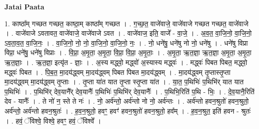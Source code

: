 \documentclass[17pt]{extarticle}
\begin{document}
\textbf{Jatai Paata} \newline

1. काष्ठा᳚म् गच्छत गच्छत॒ काष्ठा॒म् काष्ठा᳚म् गच्छत । . ग॒च्छ॒त॒ वाजे॑वाजे॒ वाजे॑वाजे गच्छत गच्छत॒ वाजे॑वाजे । . वाजे॑वाजे ऽवतावत॒ वाजे॑वाजे॒ वाजे॑वाजे ऽवत । . वाजे॑वाज॒ इति॒ वाजे᳚ - वा॒जे॒ । . अ॒व॒त॒ वा॒जि॒नो॒ वा॒जि॒नो॒ ऽव॒ता॒व॒त॒ वा॒जि॒नः॒ । . वा॒जि॒नो॒ नो॒ नो॒ वा॒जि॒नो॒ वा॒जि॒नो॒ नः॒ । . नो॒ धने॑षु॒ धने॑षु नो नो॒ धने॑षु । . धने॑षु विप्रा विप्रा॒ धने॑षु॒ धने॑षु विप्राः । . वि॒प्रा॒ अ॒मृ॒ता॒ अ॒मृ॒ता॒ वि॒प्रा॒ वि॒प्रा॒ अ॒मृ॒ताः॒ । . अ॒मृ॒ता॒ ऋ॒त॒ज्ञा॒ ऋ॒त॒ज्ञा॒ अ॒मृ॒ता॒ अ॒मृ॒ता॒ ऋ॒त॒ज्ञाः॒ । . ऋ॒त॒ज्ञा॒ इत्यृ॑त - ज्ञाः॒ । . अ॒स्य मद्ध्वो॒ मद्ध्वो॑ अ॒स्यास्य मद्ध्वः॑ । . मद्ध्वः॑ पिबत पिबत॒ मद्ध्वो॒ मद्ध्वः॑ पिबत । . पि॒ब॒त॒ मा॒दय॑द्ध्वम् मा॒दय॑द्ध्वम् पिबत पिबत मा॒दय॑द्ध्वम् । . मा॒दय॑द्ध्वम् तृ॒प्तास्तृ॒प्ता मा॒दय॑द्ध्वम् मा॒दय॑द्ध्वम् तृ॒प्ताः । . तृ॒प्ता या॑त यात तृ॒प्ता स्तृ॒प्ता या॑त । . या॒त॒ प॒थिभिः॑ प॒थिभि॑र् यात यात प॒थिभिः॑ । . प॒थिभि॑र् देव॒यानै᳚र् देव॒यानैः᳚ प॒थिभिः॑ प॒थिभि॑र् देव॒यानैः᳚ । . प॒थिभि॒रिति॑ प॒थि - भिः॒ । . दे॒व॒यानै॒रिति॑ देव - यानैः᳚ । . ते नो॑ न॒ स्ते ते नः॑ । . नो॒ अर्व॑न्तो॒ अर्व॑न्तो नो नो॒ अर्व॑न्तः । . अर्व॑न्तो हवन॒श्रुतो॑ हवन॒श्रुतो॒ अर्व॑न्तो॒ अर्व॑न्तो हवन॒श्रुतः॑ । . ह॒व॒न॒श्रुतो॒ हवꣳ॒॒ हवꣳ॑ हवन॒श्रुतो॑ हवन॒श्रुतो॒ हव᳚म् । . ह॒व॒न॒श्रुत॒ इति॑ हवन - श्रुतः॑ । . हवं॒ ॅविश्वे॒ विश्वे॒ हवꣳ॒॒ हवं॒ ॅविश्वे᳚ । \newline
\end{document}
